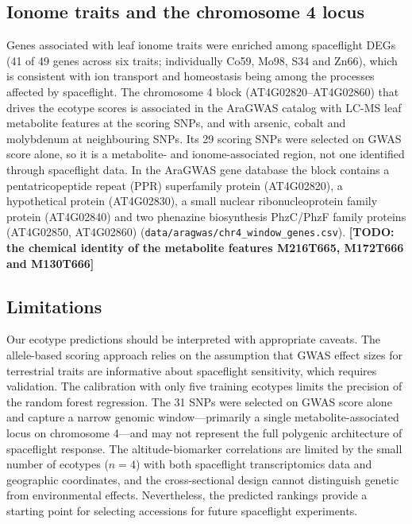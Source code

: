 \documentclass[sn-mathphys-num,Basic]{sn-jnl}
\begin{document}
\subsection*{Ionome traits and the chromosome 4 locus}

Genes associated with leaf ionome traits were enriched among spaceflight DEGs (41 of 49 genes across six traits; individually Co59, Mo98, S34 and Zn66), which is consistent with ion transport and homeostasis being among the processes affected by spaceflight. The chromosome 4 block (AT4G02820--AT4G02860) that drives the ecotype scores is associated in the AraGWAS catalog with LC-MS leaf metabolite features at the scoring SNPs, and with arsenic, cobalt and molybdenum at neighbouring SNPs. Its 29 scoring SNPs were selected on GWAS score alone, so it is a metabolite- and ionome-associated region, not one identified through spaceflight data. In the AraGWAS gene database the block contains a pentatricopeptide repeat (PPR) superfamily protein (AT4G02820), a hypothetical protein (AT4G02830), a small nuclear ribonucleoprotein family protein (AT4G02840) and two phenazine biosynthesis PhzC/PhzF family proteins (AT4G02850, AT4G02860) (\texttt{data/aragwas/chr4\_window\_genes.csv}). \textbf{[TODO: the chemical identity of the metabolite features M216T665, M172T666 and M130T666]}

\subsection*{Limitations}

Our ecotype predictions should be interpreted with appropriate caveats. The allele-based scoring approach relies on the assumption that GWAS effect sizes for terrestrial traits are informative about spaceflight sensitivity, which requires validation. The calibration with only five training ecotypes limits the precision of the random forest regression. The 31 SNPs were selected on GWAS score alone and capture a narrow genomic window---primarily a single metabolite-associated locus on chromosome 4---and may not represent the full polygenic architecture of spaceflight response. The altitude-biomarker correlations are limited by the small number of ecotypes ($n = 4$) with both spaceflight transcriptomics data and geographic coordinates, and the cross-sectional design cannot distinguish genetic from environmental effects. Nevertheless, the predicted rankings provide a starting point for selecting accessions for future spaceflight experiments.
\end{document}
